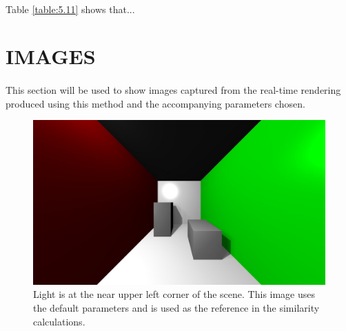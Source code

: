 \paragraph{}
Table \ref{table:5.11} shows that...


\section{IMAGES}
\paragraph{}
This section will be used to show images captured from the real-time rendering produced using this method and the accompanying parameters chosen.


\begin{figure}[h!]
  \centering
    \includegraphics[width=1.0\textwidth]{sample1.jpg}
  \caption{Light is at the near upper left corner of the scene. This image uses the default parameters and is used as the reference in the similarity calculations.}
	\label{fig:defaultimage}
\end{figure}


